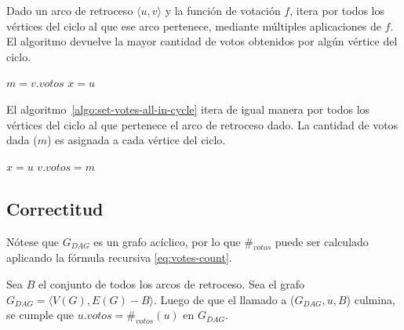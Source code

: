 Dado un arco de retroceso $\langle u, v \rangle$ y la funci\'on de votaci\'on $f$, \maxincyclecaption \;itera por todos los v\'ertices del ciclo al que ese arco pertenece, mediante m\'ultiples aplicaciones de $f$. El algoritmo devuelve la mayor cantidad de votos obtenidos por alg\'un v\'ertice del ciclo. 

\begin{algorithm}[!h]
    \caption{\maxincyclecaption}
    \label{algo:max-in-cycle}
    \DontPrintSemicolon
    \SetAlgoLined
    \BlankLine

    $m = v.votos$\;\label{algo:max-in-cycle:line:m-declaration}
    $x = u$\;
    \;
\end{algorithm}

El algoritmo~\ref{algo:set-votes-all-in-cycle} itera de igual manera por todos los v\'ertices del ciclo al que pertenece el arco de retroceso dado. La cantidad de votos dada ($m$) es asignada a cada v\'ertice del ciclo.

\begin{algorithm}[!h]
    \caption{\setvotestoallincyclecaption}
    \label{algo:set-votes-all-in-cycle}
    \DontPrintSemicolon
    \SetAlgoLined
    \BlankLine

    $x = u$\;
    $v.votos = m$\;
\end{algorithm}

\subsection{Correctitud}
N\'otese que $G_{DAG}$ es un grafo ac\'iclico, por lo que  $\#_{votos}$ puede ser calculado aplicando la f\'ormula recursiva \eqref{eq:votes-count}. 


\begin{lemma}\label{lemma:dfs-visit}
    Sea $B$ el conjunto de todos los arcos de retroceso. Sea el grafo $G_{DAG} = \langle V(G), E(G) - B \rangle$.  Luego de que el llamado a \dfsvisitcaption($G_{DAG}, u, B$) culmina, se cumple que $u.votos = \#_{votos}(u)$ en $G_{DAG}$.
\end{lemma}

